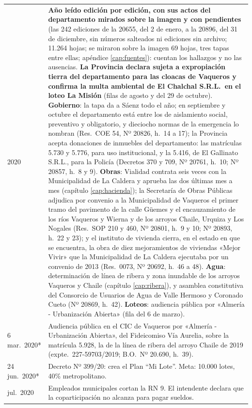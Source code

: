 \begin{longtable}{@{}p{2.7cm}p{10.3cm}@{}}
2020 & \textbf{Año leído edición por edición, con sus actos del departamento mirados sobre la imagen y con pendientes} (las 242 ediciones de la 20655, del 2 de enero, a la 20896, del 31 de diciembre, sin números salteados ni ediciones sin archivo; 11.264 hojas; se miraron sobre la imagen 69 hojas, tres tapas entre ellas; apéndice \ref{cap:fuentes}): cuentan los hallazgos y no las ausencias. \textbf{La Provincia declara sujeta a expropiación tierra del departamento para las cloacas de Vaqueros y confirma la multa ambiental de El Chalchal S.R.L.\ en el loteo La Misión} (filas de agosto y del 29 de octubre). \textbf{Gobierno}: la tapa da a Sáenz todo el año; en septiembre y octubre el departamento está entre los de aislamiento social, preventivo y obligatorio, y dieciocho normas de la emergencia lo nombran (Res.\ COE 54, Nº 20826, h.\ 14 a 17); la Provincia acepta donaciones de inmuebles del departamento: las matrículas 5.730 y 5.776, para uso institucional, y la 5.416, de El Gallinato S.R.L., para la Policía (Decretos 370 y 709, Nº 20761, h.\ 10; Nº 20857, h.\ 8 y 9). \textbf{Obras}: Vialidad contrata seis veces con la Municipalidad de La Caldera y aprueba las dos últimas mes a mes (capítulo \ref{cap:hacienda}); la Secretaría de Obras Públicas adjudica por convenio a la Municipalidad de Vaqueros el primer tramo del pavimento de la calle Güemes y el encauzamiento de los ríos Vaqueros y Wierna y de los arroyos Chaile, Urquiza y Los Nogales (Res.\ SOP 210 y 460, Nº 20801, h.\ 9 y 10; Nº 20893, h.\ 22 y 23); y el instituto de vivienda cierra, en el estado en que se encuentra, la obra de diez mejoramientos de viviendas «Mejor Vivir» que la Municipalidad de La Caldera ejecutaba por un convenio de 2013 (Res.\ 0073, Nº 20692, h.\ 46 a 48). \textbf{Agua}: determinación de línea de ribera y zona inundable de los arroyos Vaqueros y Chaile (capítulo \ref{cap:ribera}), y asamblea constitutiva del Consorcio de Usuarios de Agua de Valle Hermoso y Coronado Cueto (Nº 20869, h.\ 42). \textbf{Loteos}: audiencia pública por «Almería - Urbanización Abierta» (fila del 6 de marzo). \\
6 mar.\ 2020* & Audiencia pública en el CIC de Vaqueros por «Almería - Urbanización Abierta», del Fideicomiso Vía Aurelia, sobre la matrícula 5.928, la de la línea de ribera del arroyo Chaile de 2019 (expte.\ 227-59703/2019; B.O.\ Nº 20.690, h.\ 39). \\
24 jun.\ 2020* & Decreto Nº 399/20: crea el Plan ``Mi Lote''. Meta: 10.000 lotes, 40\% metropolitano. \\
jul.\ 2020 & Empleados municipales cortan la RN 9. El intendente declara que la coparticipación no alcanza para pagar sueldos. \\

\end{longtable}
